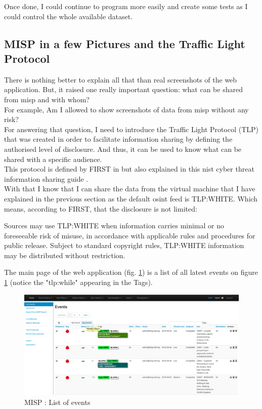 \documentclass{eplmastersthesis}
\begin{document}
Once done, I could continue to program more easily and create some tests as I could control the whole available dataset.\\

\subsection{MISP in a few Pictures and the Traffic Light Protocol}
There is nothing better to explain all that than real screenshots of the web application. But, it raised one really important question: what can be shared from \gls{misp} and with whom?\\
For example, Am I allowed to show screenshots of data from \gls{misp} without any risk?\\
For answering that question, I need to introduce the Traffic Light Protocol (TLP) that was created in order to facilitate information sharing by defining the authorised level of disclosure. And thus, it can be used to know what can be shared with a specific audience.\\
This protocol is defined by FIRST in \cite{FirstTLP} but also explained in this \gls{nist} cyber threat information sharing guide \cite{johnson2016guide}.\\

With that I know that I can share the data from the virtual machine that I have explained in the previous section as the default \gls{osint} feed is TLP:WHITE. Which means, according to FIRST, that the disclosure is not limited: \\

\begin{boxedverbatim}
	Sources may use TLP:WHITE when information carries minimal or no foreseeable 
	risk of misuse, in accordance with applicable rules and procedures for public 
	release. Subject to standard copyright rules, TLP:WHITE information may be 
	distributed without restriction.
\end{boxedverbatim}

The main page of the web application (fig. \ref{webevents}) is a list of all latest events on figure \ref{webevents} (notice the "tlp:while" appearing in the Tags).

\begin{figure}[!h]
	\begin{center}
		\includegraphics[scale=0.32]{res/webEvents}
		\caption{MISP : List of events}
		\label{webevents}
	\end{center}
\end{figure}
\end{document}
